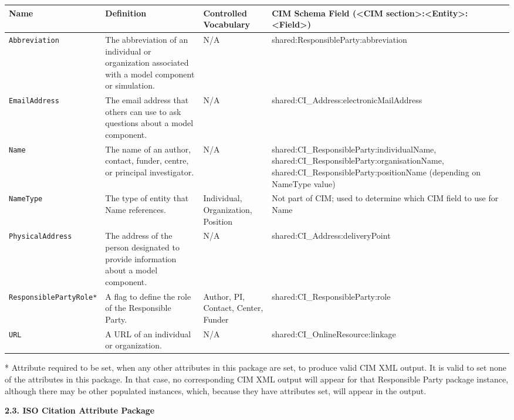 \begin{longtable}{|p{4.5cm}|p{3cm}|p{2cm}|p{6.5cm}|}
     \hline\hline
     {\bf Name} & {\bf Definition} & {\bf Controlled Vocabulary} & {\bf CIM Schema Field (<CIM section>:<Entity>:<Field>)}\\
     \hline\hline
     {\tt Abbreviation} & The abbreviation of an individual or organization associated with a model component or simulation. & N/A & shared:ResponsibleParty:abbreviation \\
     {\tt EmailAddress} & The email address that others can use to ask questions about a model component. & N/A & shared:CI\_Address:electronicMailAddress \\
     {\tt Name} & The name of an author, contact, funder, centre, or principal investigator. & N/A & shared:CI\_ResponsibleParty:individualName, shared:CI\_ResponsibleParty:organisationName, shared:CI\_ResponsibleParty:positionName (depending on NameType value) \\
     {\tt NameType} & The type of entity that Name references. & Individual, Organization, Position & Not part of CIM; used to determine which CIM field to use for Name \\
     {\tt PhysicalAddress} & The address of the person designated to provide information about a model component. & N/A & shared:CI\_Address:deliveryPoint \\
     {\tt ResponsiblePartyRole*} & A flag to define the role of the Responsible Party. & Author, PI, Contact, Center, Funder & shared:CI\_ResponsibleParty:role \\
     {\tt URL} & A URL of an individual or organization. & N/A & shared:CI\_OnlineResource:linkage \\
     \hline\hline
\end{longtable}
* Attribute required to be set, when any other attributes in this package are set, to produce valid CIM XML output. It is valid to set none of the attributes in this package. In that case, no corresponding CIM XML output will appear for that Responsible Party package instance, although there may be other populated instances, which, because they have attributes set, will appear in the output.


{\bf 2.3. ISO Citation Attribute Package}

